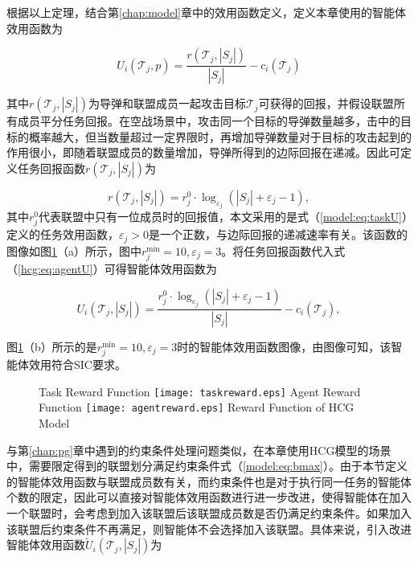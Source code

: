 根据以上定理，结合第\ref{chap:model}章中的效用函数定义，定义本章使用的智能体效用函数为

\begin{equation}
\label{hcg:eq:agentU}
	U_i(\mathcal{T}_j,p) = \frac{r(\mathcal{T}_j,|S_j|)}{|S_j|} - c_i(\mathcal{T}_j)
\end{equation}

其中$r(\mathcal{T}_j,|S_j|)$为导弹和联盟成员一起攻击目标$\mathcal{T}_j$可获得的回报，并假设联盟所有成员平分任务回报。在空战场景中，攻击同一个目标的导弹数量越多，击中的目标的概率越大，但当数量超过一定界限时，再增加导弹数量对于目标的攻击起到的作用很小，即随着联盟成员的数量增加，导弹所得到的边际回报在递减。因此可定义任务回报函数$r(\mathcal{T}_j,|S_j|)$为

\begin{equation}
\label{hcg:eq:task_reward}
	r(\mathcal{T}_j,|S_j|) = r_j^0 \cdot \log_{\varepsilon_j} (|S_j|+\varepsilon_j-1),
\end{equation}
其中$r_j^0$代表联盟中只有一位成员时的回报值，本文采用的是式（\ref{model:eq:taskU}）定义的任务效用函数，$\varepsilon_j>0$是一个正数，与边际回报的递减速率有关。该函数的图像如图\ref{hcg:fig:rewardfunc}（a）所示，图中$r_j^{\text{min}}=10, \varepsilon_j = 3$。将任务回报函数代入式（\ref{hcg:eq:agentU}）可得智能体效用函数为

\begin{equation}
\label{hcg:eq:agentU_reward}
	U_i(\mathcal{T}_j,|S_j|) = \frac{r_j^0 \cdot \log_{\varepsilon_j} (|S_j|+\varepsilon_j-1)}{|S_j|} - c_i(\mathcal{T}_j),
\end{equation}

图\ref{hcg:fig:rewardfunc}（b）所示的是$r_j^{\text{min}}=10,\varepsilon_j=3$时的智能体效用函数图像，由图像可知，该智能体效用符合SIC要求。

\begin{figure}[!hbtp]
  \centering
                  {Task Reward Function}%
                  {\texttt{[image: taskreward.eps]}}
  \hspace{2cm}
                  {Agent Reward Function}%
                  {\texttt{[image: agentreward.eps]}}
            {Reward Function of HCG Model}
  \label{hcg:fig:rewardfunc}
\end{figure}

与第\ref{chap:pg}章中遇到的约束条件处理问题类似，在本章使用HCG模型的场景中，需要限定得到的联盟划分满足约束条件式（\ref{model:eq:bmax}）。由于本节定义的智能体效用函数与联盟成员数有关，而约束条件也是对于执行同一任务的智能体个数的限定，因此可以直接对智能体效用函数进行进一步改进，使得智能体在加入一个联盟时，会考虑到加入该联盟后该联盟成员数是否仍满足约束条件。如果加入该联盟后约束条件不再满足，则智能体不会选择加入该联盟。具体来说，引入改进智能体效用函数$\widetilde U_i(\mathcal{T}_j,|S_j|)$为

